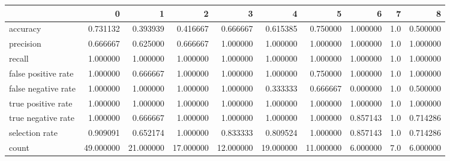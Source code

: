 \begin{tabular}{lrrrrrrrrr}
\toprule
{} &          0 &          1 &          2 &          3 &          4 &          5 &         6 &    7 &         8 \\
\midrule
accuracy            &   0.731132 &   0.393939 &   0.416667 &   0.666667 &   0.615385 &   0.750000 &  1.000000 &  1.0 &  0.500000 \\
precision           &   0.666667 &   0.625000 &   0.666667 &   1.000000 &   1.000000 &   1.000000 &  1.000000 &  1.0 &  1.000000 \\
recall              &   1.000000 &   1.000000 &   1.000000 &   1.000000 &   1.000000 &   1.000000 &  1.000000 &  1.0 &  1.000000 \\
false positive rate &   1.000000 &   0.666667 &   1.000000 &   1.000000 &   1.000000 &   0.750000 &  1.000000 &  1.0 &  1.000000 \\
false negative rate &   1.000000 &   1.000000 &   1.000000 &   1.000000 &   0.333333 &   0.666667 &  0.000000 &  1.0 &  0.500000 \\
true positive rate  &   1.000000 &   1.000000 &   1.000000 &   1.000000 &   1.000000 &   1.000000 &  1.000000 &  1.0 &  1.000000 \\
true negative rate  &   1.000000 &   0.666667 &   1.000000 &   1.000000 &   1.000000 &   1.000000 &  0.857143 &  1.0 &  0.714286 \\
selection rate      &   0.909091 &   0.652174 &   1.000000 &   0.833333 &   0.809524 &   1.000000 &  0.857143 &  1.0 &  0.714286 \\
count               &  49.000000 &  21.000000 &  17.000000 &  12.000000 &  19.000000 &  11.000000 &  6.000000 &  7.0 &  6.000000 \\
\bottomrule
\end{tabular}
